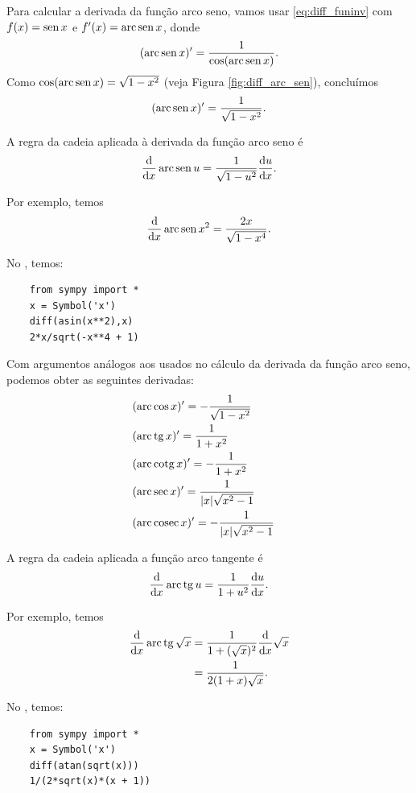 Para calcular a derivada da função arco seno, vamos usar \eqref{eq:diff_funinv} com $f(x)=\operatorname{sen} x$ e $f'(x) = \operatorname{arc}\operatorname{sen} x$, donde
\begin{equation}
  (\operatorname{arc}\operatorname{sen} x)' = \frac{1}{\cos(\operatorname{arc}\operatorname{sen} x)}.
\end{equation}
Como $\cos(\operatorname{arc}\operatorname{sen} x) = \sqrt{1-x^2}$ (veja Figura \ref{fig:diff_arc_sen}), concluímos
\begin{equation}
  (\operatorname{arc}\operatorname{sen} x)' = \frac{1}{\sqrt{1-x^2}}.
\end{equation}


\begin{ex}
  A regra da cadeia aplicada à derivada da função arco seno é
  \begin{equation}
    \frac{\mathrm{d}}{\mathrm{d} x}\operatorname{arc}\operatorname{sen} u = \frac{1}{\sqrt{1-u^2}}\frac{\mathrm{d} u}{\mathrm{d} x}.
  \end{equation}

  Por exemplo, temos
  \begin{equation}
    \frac{\mathrm{d}}{\mathrm{d} x}\operatorname{arc}\operatorname{sen} x^2 = \frac{2x}{\sqrt{1-x^4}}.
  \end{equation}

  \ifispython
  No \sympy, temos:
  \begin{lstlisting}
    from sympy import *
    x = Symbol('x')
    diff(asin(x**2),x)
    2*x/sqrt(-x**4 + 1)
  \end{lstlisting}
  \fi    
\end{ex}

Com argumentos análogos aos usados no cálculo da derivada da função arco seno, podemos obter as seguintes derivadas:
\begin{align}
  & (\operatorname{arc}\cos x)' = -\frac{1}{\sqrt{1-x^2}} & \\
  &(\operatorname{arc}\operatorname{tg} x)' = \frac{1}{1+x^2} \\
  & (\operatorname{arc}\operatorname{cotg} x)' = -\frac{1}{1+x^2} \\
  & (\operatorname{arc}\sec x)' = \frac{1}{|x|\sqrt{x^2-1}} \\
  & (\operatorname{arc}\operatorname{cosec} x)' = -\frac{1}{|x|\sqrt{x^2-1}}
\end{align}

\begin{ex}
  A regra da cadeia aplicada a função arco tangente é
  \begin{equation}
    \frac{\mathrm{d}}{\mathrm{d} x}\operatorname{arc}\operatorname{tg} u = \frac{1}{1+u^2}\frac{\mathrm{d} u}{\mathrm{d} x}.
  \end{equation}

  Por exemplo, temos
  \begin{align}
    \frac{\mathrm{d}}{\mathrm{d} x}\operatorname{arc}\operatorname{tg}\sqrt{x} &= \frac{1}{1+(\sqrt{x})^2}\frac{\mathrm{d}}{\mathrm{d} x}\sqrt{x} \\
                                     &=  \frac{1}{2(1+x)\sqrt{x}}.
  \end{align}

  \ifispython
  No \sympy, temos:
  \begin{lstlisting}
    from sympy import *
    x = Symbol('x')
    diff(atan(sqrt(x)))
    1/(2*sqrt(x)*(x + 1))
  \end{lstlisting}
  \fi    
\end{ex}

